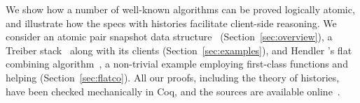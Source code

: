 We show how a number of well-known algorithms can be proved logically
atomic, and illustrate how the specs with histories facilitate
client-side reasoning. We consider an atomic pair snapshot data
structure~\cite{Qadeer-al:TR09,Liang-Feng:PLDI13}
(Section~\ref{sec:overview}), a Treiber stack~\cite{Treiber:TR} along
with its clients (Section~\ref{sec:examples}), and Hendler \etal's
flat combining algorithm~\cite{Hendler-al:SPAA10}, a non-trivial
example employing first-class functions and helping
(Section~\ref{sec:flatco}). All our proofs, including the theory of
histories, have been checked mechanically in Coq, and the sources are
available online~\cite{Sergey-al:ESOP15ext}.
%

